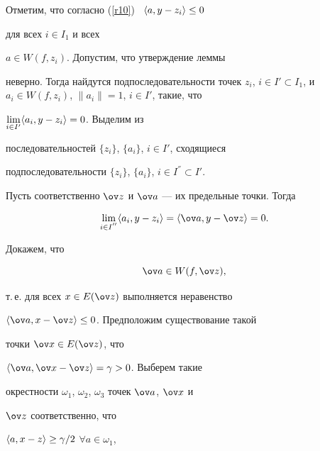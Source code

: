 \begin{pf}


Отметим, что согласно (\ref{r10}) \ $\langle a, y- z_i \rangle \le 0$


для всех $i\in I_1$ и всех\linebreak


$a\in W(f,z_i)$. Допустим, что утверждение леммы


неверно. Тогда найдутся подпоследовательности точек $z_i$, $i\in I'\subset


I_1$, и $a_i\in W(f,z_i)$, $\|a_i\|=1$, $i\in I'$, такие, что


$\lim \limits_{i\in I'} \langle a_i, y-z_i\rangle =0$. Выделим из


последовательностей $\{z_i\}$, $\{a_i\}$, $i\in I'$, сходящиеся


подпоследовательности $\{z_i\}$, $\{a_i\}$, $i\in I^{''} \subset I'$.


Пусть соответственно $\ov z$ и $\ov a$ --- их предельные точки. Тогда




\begin{equation} \label{r12}


\lim \limits_{i\in I^{''}} \la a_i, y-z_i\ra =


\la \ov a, y- \ov z \ra =0.


\end{equation}


%





Докажем, что




\begin{equation} \label{r13}


\ov a\in W(f,\ov z),


\end{equation}


%


т.\,е. для всех $x\in E(\ov z)$ выполняется неравенство


$\la \ov a, x- \ov z \ra \le0$. Предположим существование такой


точки $\ov x\in E(\ov z)$, что


$\la \ov a, \ov x- \ov z \ra =\gamma>0$. Выберем такие


окрестности $\omega_1$, $\omega_2$, $\omega_3$ точек $\ov a$, $\ov x$ и


$\ov z$ соответственно, что


$\langle a, x- z \rangle \ge \gamma /2$ $\forall a\in \omega_1$,



\end{pf}
